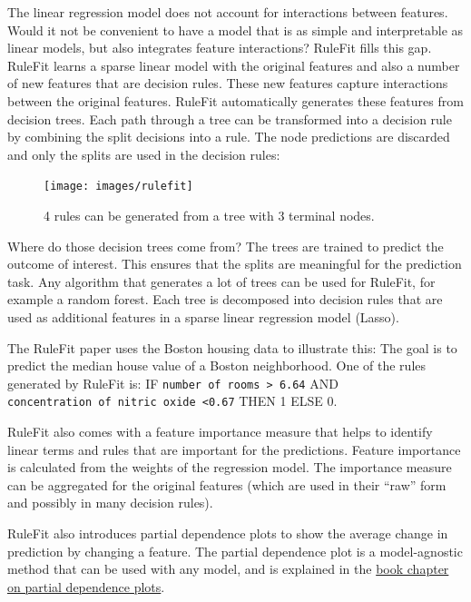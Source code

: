 \documentclass[
  10pt,
]{scrbook}
\begin{document}
The linear regression model does not account for interactions between features.
Would it not be convenient to have a model that is as simple and interpretable as linear models, but also integrates feature interactions?
RuleFit fills this gap.
RuleFit learns a sparse linear model with the original features and also a number of new features that are decision rules.
These new features capture interactions between the original features.
RuleFit automatically generates these features from decision trees.
Each path through a tree can be transformed into a decision rule by combining the split decisions into a rule.
The node predictions are discarded and only the splits are used in the decision rules:

\begin{figure}

{\centering \texttt{[image: images/rulefit]} 

}

\caption{4 rules can be generated from a tree with 3 terminal nodes.}\label{fig:rulefit-split}
\end{figure}

Where do those decision trees come from?
The trees are trained to predict the outcome of interest.
This ensures that the splits are meaningful for the prediction task.
Any algorithm that generates a lot of trees can be used for RuleFit, for example a random forest.
Each tree is decomposed into decision rules that are used as additional features in a sparse linear regression model (Lasso).

The RuleFit paper uses the Boston housing data to illustrate this:
The goal is to predict the median house value of a Boston neighborhood.
One of the rules generated by RuleFit is:
IF \texttt{number\ of\ rooms\ \textgreater{}\ 6.64} AND \texttt{concentration\ of\ nitric\ oxide\ \textless{}0.67} THEN 1 ELSE 0.

RuleFit also comes with a feature importance measure that helps to identify linear terms and rules that are important for the predictions.
Feature importance is calculated from the weights of the regression model.
The importance measure can be aggregated for the original features (which are used in their ``raw'' form and possibly in many decision rules).

RuleFit also introduces partial dependence plots to show the average change in prediction by changing a feature.
The partial dependence plot is a model-agnostic method that can be used with any model, and is explained in the \protect\hyperlink{pdp}{book chapter on partial dependence plots}.
\end{document}
